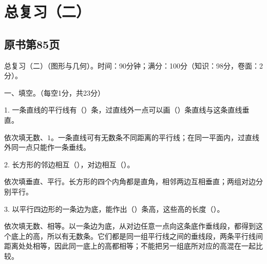 
\section{总复习（二）}



\subsection*{原书第85页}

总复习（二）（图形与几何）。时间：90分钟；满分：100分（知识：98分，卷面：2分）。\par 一、填空。（每空1分，共23分）\par 1. 一条直线的平行线有（\hspace{1.8em}）条，过直线外一点可以画（\hspace{1.8em}）条直线与这条直线垂直。\par
\begin{BookAnswer}
依次填无数、\(1\)。一条直线可有无数条不同距离的平行线；在同一平面内，过直线外同一点只能作一条垂线。
\end{BookAnswer}

2. 长方形的邻边相互（\hspace{1.8em}），对边相互（\hspace{1.8em}）。\par
\begin{BookAnswer}
依次填垂直、平行。长方形的四个内角都是直角，相邻两边互相垂直；两组对边分别平行。
\end{BookAnswer}

3. 以平行四边形的一条边为底，能作出（\hspace{1.8em}）条高，这些高的长度（\hspace{1.8em}）。\par
\begin{BookAnswer}
依次填无数、相等。以一条边为底，从对边任意一点向这条底作垂线段，都得到这个底上的高，所以有无数条。它们都是同一组平行线之间的垂线段，两条平行线间距离处处相等，因此同一底上的高都相等；不能把另一组底所对应的高混在一起比较。
\end{BookAnswer}

